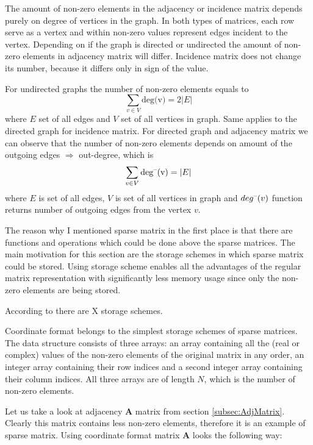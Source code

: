 \documentclass[thesis=M,english]{FITthesis}[2012/10/20]
\begin{document}
The amount of non-zero elements in the adjacency or incidence matrix depends purely on degree of vertices in the graph. In both types of matrices, each row serve as a vertex and within non-zero values represent edges incident to the vertex. Depending on if the graph is directed or undirected the amount of non-zero elements in adjacency matrix will differ. Incidence matrix does not change its number, because it differs only in sign of the value. 

For undirected graphs the number of non-zero elements equals to $$ \sum_{v \in V} \textrm{deg(v)} = 2|E| $$ where $E$ set of all edges and $V$ set of all vertices in graph. Same applies to the directed graph for incidence matrix. For directed graph and adjacency matrix we can observe that the number of non-zero elements depends on amount of the outgoing edges $\Rightarrow$ out-degree, which is 
$$ \sum_{v \in V} \textrm{deg\textsuperscript{--}(v)} = |E| $$ where $E$ is set of all edges, $V$ is set of all vertices in graph and $deg\textsuperscript{--}(v)$ function returns number of outgoing edges from the vertex $v$.

The reason why I mentioned sparse matrix in the first place is that there are functions and operations which could be done above the sparse matrices. The main motivation for this section are the storage schemes in which sparse matrix could be stored. Using storage scheme enables all the advantages of the regular matrix representation with significantly less memory usage since only the non-zero elements are being stored.

According to %
there are X storage schemes. 

Coordinate format belongs to the simplest storage schemes of sparse matrices. The data structure consists of three arrays: an array containing all the (real or complex) values of the non-zero elements of the original matrix in any order, an integer array containing their row indices and a second integer array containing their column indices. All three arrays are of length $N$, which is the number of non-zero elements.

Let us take a look at adjacency $\textbf{A}$ matrix from section \ref{subsec:AdjMatrix}. Clearly this matrix contains less non-zero elements, therefore it is an example of sparse matrix. Using coordinate format matrix $\textbf{A}$ looks the following way:
\end{document}
